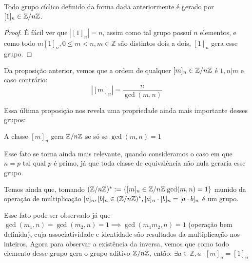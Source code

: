 \documentclass[../main]{subfiles}
\begin{document}
\begin{prop}
    Todo grupo cíclico definido da forma dada anteriormente é gerado por \([1]_n
    \in \mathbb Z/ n\mathbb Z\).
\end{prop}
\begin{proof}
    É fácil ver que \(|[1]_n| = n\), assim como tal grupo possuí \(n\)
    elementos, e como todo \(m [1]_n, 0 \leq m < n, m \in \mathbb Z\) são
    distintos dois a dois, \([1]_n\) gera esse grupo.
\end{proof}
\begin{prop}
    Da proposição anterior, vemos que a ordem de qualquer \([m]_n \in \mathbb Z/ n\mathbb Z\) é \(1, n | m\) e caso contrário:
    \[|[m]_n| = \frac{n}{\gcd(m, n)}\]
\end{prop}

Essa última proposição nos revela uma propriedade ainda mais importante desses
grupos:
\begin{corol}
    A classe \([m]_n\) gera \(\mathbb Z/ n\mathbb Z\) se só se \(\gcd(m, n) = 1\)   
\end{corol}

Esse fato se torna ainda mais relevante, quando consideramos o caso em que \(n =
p\) tal qual \(p\) é primo, já que toda classe de equivalência não nula geraria
esse grupo.

Temos ainda que, tomando \((\mathbb Z/ n\mathbb Z)^* := \{[m]_n \in \mathbb Z/ n\mathbb Z |
\text{gcd}(m, n) = 1\}\) munido da operação de multiplicação \([a]_n, [b]_n \in
(\mathbb Z/ n\mathbb Z)^*, [a]_n \cdot [b]_n = [a \cdot b]_n\) é um grupo. 

Esse fato pode ser observado já que \(\gcd(m_1, n) = \gcd(m_2, n) = 1 \implies \gcd(m_1m_2, n) = 1\) (operação bem definida), cuja associatividade e identidade são resultados da multiplicação nos inteiros. Agora para observar a existência da inversa, vemos que como todo elemento desse grupo gera o grupo aditivo \(\mathbb Z/ n\mathbb Z\), então:
\(\exists a \in \mathbb Z, a \cdot [m]_n = [1]_n\)
\end{document}
